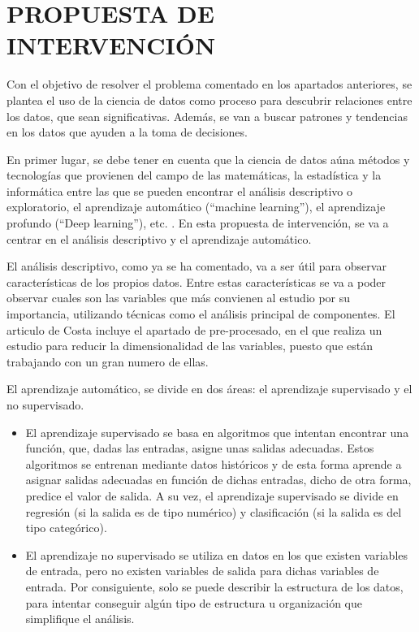 \section{PROPUESTA DE INTERVENCIÓN}

Con el objetivo de resolver el problema comentado en los apartados anteriores, se plantea el uso de la ciencia de datos como proceso para descubrir relaciones entre los datos, que sean significativas. Además, se van a buscar patrones y tendencias en los datos que ayuden a la toma de decisiones.

En primer lugar, se debe tener en cuenta que la ciencia de datos aúna métodos y tecnologías que provienen del campo de las matemáticas, la estadística y la informática entre las que se pueden encontrar el análisis descriptivo o exploratorio, el aprendizaje automático (“machine learning”), el aprendizaje profundo (“Deep learning”), etc. \cite{Marin2018}. En esta propuesta de intervención, se va a centrar en el análisis descriptivo y el aprendizaje automático.

El análisis descriptivo, como ya se ha comentado, va a ser útil para observar características de los propios datos. Entre estas características se va a poder observar cuales son las variables que más convienen al estudio por su importancia, utilizando técnicas como el análisis principal de componentes. El articulo de Costa \cite{Costa2017} incluye el apartado de pre-procesado, en el que realiza un estudio para reducir la dimensionalidad de las variables, puesto que están trabajando con un gran numero de ellas.

El aprendizaje automático, se divide en dos áreas: el aprendizaje supervisado y el no supervisado. 

\begin{itemize}
\item El aprendizaje supervisado se basa en algoritmos que intentan encontrar una función, que, dadas las entradas, asigne unas salidas adecuadas. Estos algoritmos se entrenan mediante datos históricos y de esta forma aprende a asignar salidas adecuadas en función de dichas entradas, dicho de otra forma, predice el valor de salida. A su vez, el aprendizaje supervisado se divide en regresión (si la salida es de tipo numérico) y clasificación (si la salida es del tipo categórico). \cite{Recuero2017}
\item El aprendizaje no supervisado se utiliza en datos en los que existen variables de entrada, pero no existen variables de salida para dichas variables de entrada. Por consiguiente, solo se puede describir la estructura de los datos, para intentar conseguir algún tipo de estructura u organización que simplifique el análisis.\cite{Recuero2017}
\end{itemize}

